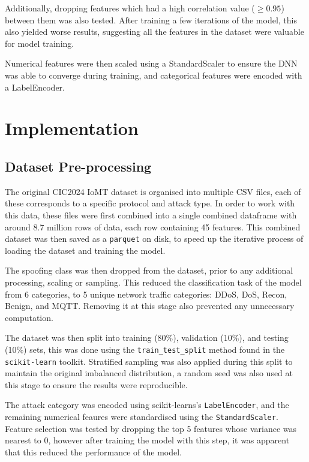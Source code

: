 \documentclass[11pt,a4paper]{article}
\begin{document}
Additionally, dropping features which had a high correlation value ($\geq 0.95$) between them was also tested. After training a few iterations of the model, this also yielded worse results, suggesting all the features in the dataset were valuable for model training.

Numerical features were then scaled using a StandardScaler to ensure the DNN was able to converge during training, and categorical features were encoded with a LabelEncoder.


\section{Implementation}
\subsection{Dataset Pre-processing}
The original CIC2024 IoMT dataset is organised into multiple CSV files, each of these corresponds to a specific protocol and attack type. In order to work with this data, these files were first combined into a single combined dataframe with around $8.7$ million rows of data, each row containing 45 features. This combined dataset was then saved as a \texttt{parquet} on disk, to speed up the iterative process of loading the dataset and training the model.

The spoofing class was then dropped from the dataset, prior to any additional processing, scaling or sampling. This reduced the classification task of the model from 6 categories, to 5 unique network traffic categories: DDoS, DoS, Recon, Benign, and MQTT. Removing it at this stage also prevented any unnecessary computation.

The dataset was then split into training (80\%), validation (10\%), and testing (10\%) sets, this was done using the \texttt{train\_test\_split} method found in the \texttt{scikit-learn} toolkit. Stratified sampling was also applied during this split to maintain the original imbalanced distribution, a random seed was also used at this stage to ensure the results were reproducible.

The attack category was encoded using scikit-learns’s \texttt{LabelEncoder}, and the remaining numerical feaures were standardised using the \texttt{StandardScaler}. Feature selection was tested by dropping the top 5 features whose variance was nearest to 0, however after training the model with this step, it was apparent that this reduced the performance of the model.
\end{document}
